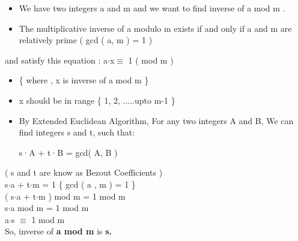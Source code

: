 \documentclass{article}
\begin{document}
\begin{tcolorbox}

\begin{itemize}
\item We have two integers a and m and we want to find inverse of a mod m .\\
\end{itemize}

\begin{itemize}
\item The multiplicative inverse of a modulo m exists if and only if a and m are relatively prime ( gcd ( a, m ) = 1 )\\
\end{itemize}

and satisfy this equation : a$\cdot $x$ \equiv $ 1\hspace{0.25cm} ( mod m )

\begin{itemize}
\item \{ where , x is inverse of a mod m \}
\end{itemize}

         
\begin{itemize}
\item x should be in range \{ 1, 2, .....upto m-1 \}
\end{itemize}

\begin{itemize}
\item By Extended Euclidean Algorithm, For any two integers A and B, We can find integers s and t, such that:

                                                s·A + t·B = gcd( A, B )  
\end{itemize}
      
( s and t are know as  Bezout Coefficients )\\

   s$\cdot $a + t$\cdot $m  = 1  \hspace{1cm} \{ gcd ( a , m ) = 1 \}\\                            
  ( s$\cdot $a + t$\cdot $m ) mod m = 1 mod m\\
   s$\cdot $a mod m = 1 mod m\\                 
   a$\cdot $s $ \equiv $ 1 mod m\\                            

So, inverse of \textbf{a mod m} is\textbf{ s.}
\end{tcolorbox}


  
\pagebreak
\end{document}
